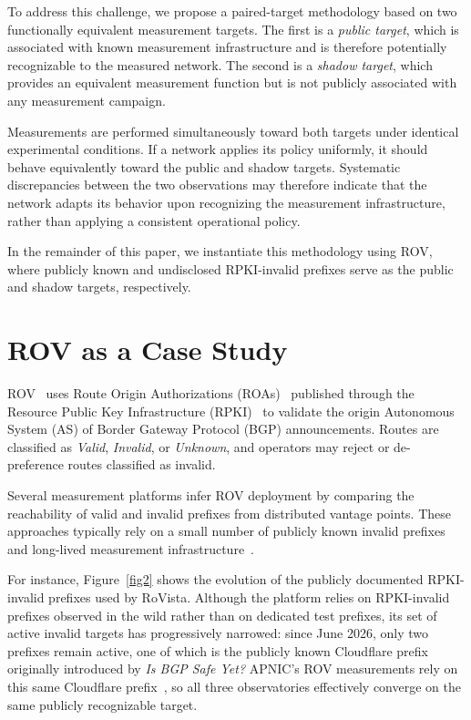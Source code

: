 \documentclass[sigconf, 10pt]{acmart}
\begin{document}
To address this challenge, we propose a paired-target methodology based on two functionally equivalent measurement targets. The first is a \emph{public target}, which is associated with known measurement infrastructure and is therefore potentially recognizable to the measured network. The second is a \emph{shadow target}, which provides an equivalent measurement function but is not publicly associated with any measurement campaign. 

Measurements are performed simultaneously toward both targets under identical experimental conditions. If a network applies its policy uniformly, it should behave equivalently toward the public and shadow targets. Systematic discrepancies between the two observations may therefore indicate that the network adapts its behavior upon recognizing the measurement infrastructure, rather than applying a consistent operational policy.

In the remainder of this paper, we instantiate this methodology using ROV, where publicly known and undisclosed RPKI-invalid prefixes serve as the public and shadow targets, respectively.


\section{ROV as a Case Study}
\label{sec:rov}

ROV~\cite{rov} uses Route Origin Authorizations (ROAs)~\cite{roa} published through the Resource Public Key Infrastructure (RPKI)~\cite{rpki} to validate the origin Autonomous System (AS) of Border Gateway Protocol (BGP) announcements. Routes are classified as \emph{Valid}, \emph{Invalid}, or \emph{Unknown}, and operators may reject or de-preference routes classified as invalid.

Several measurement platforms infer ROV deployment by comparing the reachability of valid and invalid prefixes from distributed vantage points. These approaches typically rely on a small number of publicly known invalid prefixes and long-lived measurement infrastructure~\cite{rovistaweb,apnic_rpki_stats,isbgpsafeyet}. 

For instance, Figure~\ref{fig2} shows the evolution of the publicly documented RPKI-invalid prefixes used by RoVista. Although the platform relies on RPKI-invalid prefixes observed in the wild rather than on dedicated test prefixes, its set of active invalid targets has progressively narrowed: since June 2026, only two prefixes remain active, one of which is the publicly known Cloudflare prefix originally introduced by \textit{Is BGP Safe Yet?} APNIC's ROV measurements rely on this same Cloudflare prefix~\cite{apnic_rpki_measure,rovista}, so all three observatories effectively converge on the same publicly recognizable target. 
\end{document}
